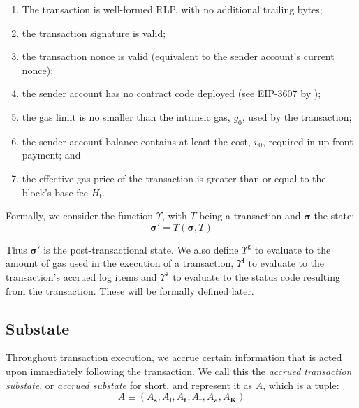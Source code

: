 \documentclass[9pt,oneside]{amsart}
\begin{document}
\begin{multicols}{2}
\begin{enumerate}
\item The transaction is well-formed RLP, with no additional trailing bytes;
\item the transaction signature is valid;
\item the \hyperlink{transaction_nonce}{transaction nonce} is valid (equivalent to the \hyperlink{account_nonce}{sender account's current nonce});
\item the sender account has no contract code deployed (see EIP-3607 by \cite{EIP-3607});
\item the gas limit is no smaller than the intrinsic gas, $g_0$, used by the transaction;
\item the sender account balance contains at least the cost, $v_0$, required in up-front payment; and
\item the effective gas price of the transaction is greater than or equal to the block's base fee $H_{\mathrm{f}}$.
\end{enumerate}

Formally, we consider the function \hyperlink{Upsilon_state_transition}{$\Upsilon$}, with $T$ being a transaction and $\boldsymbol{\sigma}$ the state:
\begin{equation}
\boldsymbol{\sigma}' = \Upsilon(\boldsymbol{\sigma}, T)
\end{equation}

Thus $\boldsymbol{\sigma}'$ is the post-transactional state. We also define \hyperlink{tx_total_gas_used_Upsilon_pow_g}{$\Upsilon^{\mathrm{g}}$} to evaluate to the amount of gas used in the execution of a transaction, \hyperlink{tx_logs_Upsilon_pow_l}{$\Upsilon^{\mathbf{l}}$} to evaluate to the transaction's accrued log items and \hyperlink{tx_status_Upsilon_pow_z}{$\Upsilon^{\mathrm{z}}$} to evaluate to the status code resulting from the transaction. These will be formally defined later.

\subsection{Substate} \label{ch:substate}
Throughout transaction execution, we accrue certain information that is acted upon immediately following the transaction. We call this the \textit{accrued transaction substate}, or \textit{accrued substate} for short, and represent it as $A$, which is a tuple:
\begin{equation}
A \equiv (A_{\mathbf{s}}, A_{\mathbf{l}}, A_{\mathbf{t}}, A_{\mathrm{r}}, A_{\mathbf{a}}, A_{\mathbf{K}})
\end{equation}


\end{multicols}
\end{document}
